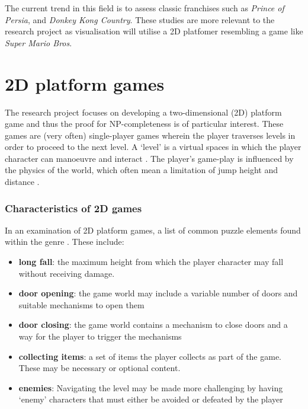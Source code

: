 \documentclass[11pt, a4paper, oneside]{report} %
\begin{document}
The current trend in this field is to assess classic franchises such as
\textit{Prince of Persia}, and \textit{Donkey Kong Country}. These studies are
more relevant to the research project as visualisation will utilise a 2D
platfomer resembling a game like \textit{Super Mario Bros}.


\section{2D platform games}

The research project focuses on developing a two-dimensional (2D) platform game
and thus the proof for NP-completeness is of particular interest. These games
are (very often) single-player games wherein the player traverses levels in
order to proceed to the next level. A `level' is a virtual spaces in which the
player character can manoeuvre and interact \cite{Burgun:2012}. The player's
game-play is influenced by the physics of the world, which often mean a
limitation of jump height and distance \cite{Burgun:2012}.

\subsubsection{Characteristics of 2D games}

In an examination of 2D platform games, a list of common puzzle elements found within the genre
\cite{Smith:2008:FAP:1401843.1401858,DBLP:conf/fun/Forisek10}. These include:

\begin{itemize}

  \item \textbf{long fall}: the maximum height from which the player character may fall without
                            receiving damage.

  \item \textbf{door opening}: the game world may include a variable number of doors and
                               suitable mechanisms to open them

  \item \textbf{door closing}: the game world contains a mechanism to close doors and a way for the
                               player to trigger the mechanisms

  \item \textbf{collecting items}: a set of items the player collects as part of the game. These may
                                   be necessary or optional content.

  \item \textbf{enemies}: Navigating the level may be made more challenging by having `enemy'
                          characters that must either be avoided or defeated by the player

\end{itemize}
\end{document}
